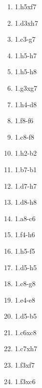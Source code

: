 \begin{enumerate}
\setcounter{enumi}{\value{d_counter}}
\item 1.\queen{}h5xf7\mate{}
\item 1.\queen{}d3xh7\mate{}
\item 1.\queen{}c3-g7\mate{}
\item 1.\queen{}h5-h7\mate{}
\item 1.\queen{}h5-h8\mate{}
\item 1.\queen{}g3xg7\mate{}

\item 1.\queen{}h4-d8\mate{}
\item 1.\queen{}f8-f6\mate{}
\item 1.\queen{}c8-f8\mate{}
\item 1.\queen{}h2-b2\mate{}
\item 1.\queen{}b7-b1\mate{}
\item 1.\queen{}d7-h7\mate{}

\item 1.\queen{}d8-h8\mate{}
\item 1.\queen{}a8-c6\mate{}
\item 1.\queen{}f4-h6\mate{}
\item 1.\queen{}h5-f5\mate{}
\item 1.\queen{}d5-h5\mate{}
\item 1.\queen{}c8-g8\mate{}

\item 1.\queen{}e4-e8\mate{}
\item 1.\queen{}d5-b5\mate{}
\item 1.\queen{}c6xc8\mate{}
\item 1.\queen{}c7xh7\mate{}
\item 1.\queen{}f3xf7\mate{}
\item 1.\queen{}f3xc6\mate{}
\setcounter{d_counter}{\value{enumi}}
\end{enumerate}